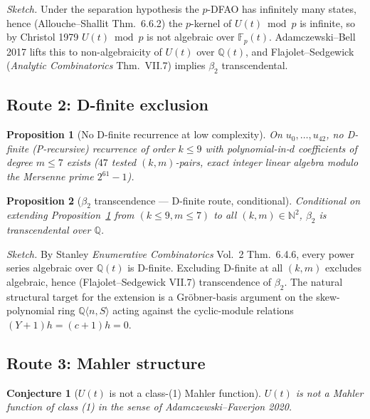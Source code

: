 \documentclass[11pt,a4paper]{article}
\newtheorem{conjecture}{Conjecture}
\newtheorem{proposition}{Proposition}
\theoremstyle{remark}
\theoremstyle{plain}
\begin{document}
\emph{Sketch.}  Under the separation hypothesis the $p$-DFAO has
infinitely many states, hence (Allouche--Shallit Thm.~6.6.2) the
$p$-kernel of $U(t) \bmod p$ is infinite, so by Christol 1979 $U(t)
\bmod p$ is not algebraic over $\mathbb{F}_p(t)$.  Adamczewski--Bell
2017 lifts this to non-algebraicity of $U(t)$ over $\mathbb{Q}(t)$, and
Flajolet--Sedgewick (\emph{Analytic Combinatorics} Thm.~VII.7) implies
$\beta_2$ transcendental.

\subsection{Route 2: D-finite exclusion}
\label{ssec:dfinite-route}

\begin{proposition}[No D-finite recurrence at low complexity]
\label{prop:no-dfinite}
On $u_0, \ldots, u_{42}$, no D-finite (P-recursive) recurrence of order
$k \le 9$ with polynomial-in-$d$ coefficients of degree $m \le 7$
exists ($47$ tested $(k, m)$-pairs, exact integer linear algebra
modulo the Mersenne prime $2^{61} - 1$).
\end{proposition}

\begin{proposition}[$\beta_2$ transcendence --- D-finite route, conditional]
\label{prop:beta2-dfinite}
Conditional on extending Proposition~\ref{prop:no-dfinite} from
$(k \le 9, m \le 7)$ to all $(k, m) \in \mathbb{N}^2$, $\beta_2$ is
transcendental over $\mathbb{Q}$.
\end{proposition}

\emph{Sketch.}  By Stanley \emph{Enumerative Combinatorics} Vol.~2
Thm.~6.4.6, every power series algebraic over $\mathbb{Q}(t)$ is
D-finite.  Excluding D-finite at all $(k, m)$ excludes algebraic, hence
(Flajolet--Sedgewick VII.7) transcendence of $\beta_2$.  The natural
structural target for the extension is a Gr\"obner-basis argument on
the skew-polynomial ring $\mathbb{Q}\langle n, S\rangle$ acting against
the cyclic-module relations $(Y+1)h = (c+1)h = 0$.

\subsection{Route 3: Mahler structure}
\label{ssec:mahler-route}

\begin{conjecture}[$U(t)$ is not a class-(1) Mahler function]
\label{conj:not-class1-mahler}
$U(t)$ is not a Mahler function of class (1) in the sense of
Adamczewski--Faverjon 2020.
\end{conjecture}
\end{document}
